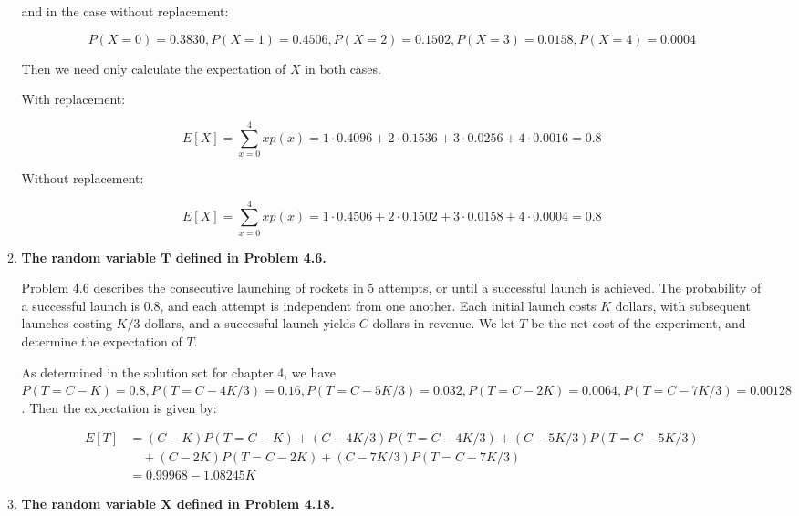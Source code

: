 \documentclass[10pt, oneside]{article}
\begin{document}
\begin{enumerate}[label=7.\arabic*]
\begin{enumerate}
	 and in the case without replacement:
	 
	  \[ P(X=0) = 0.3830, P(X = 1) = 0.4506, P(X = 2) = 0.1502, P(X = 3) = 0.0158, P(X = 4) = 0.0004 \]

	Then we need only calculate the expectation of $X$ in both cases.
	
	With replacement:
	
	\[ E[X] = \sum^4_{x=0} x p(x) = 1 \cdot 0.4096 + 2 \cdot 0.1536 + 3 \cdot 0.0256 + 4 \cdot 0.0016 = \boxed{0.8} \]
	
	Without replacement:
	
	\[ E[X] = \sum^4_{x=0} x p(x) = 1 \cdot 0.4506 + 2 \cdot 0.1502 + 3 \cdot 0.0158 + 4 \cdot 0.0004 = \boxed{0.8} \]
	
	\item  \begin{tcolorbox}[
	  colback=Cerulean!5!white,
	  colframe=Cerulean!75!black]
	\textbf{The random variable $\bm{T}$ defined in Problem 4.6.}
	\end{tcolorbox}
	
	Problem 4.6 describes the consecutive launching of rockets in 5 attempts, or until a successful launch is achieved. The probability of a successful launch is 0.8, and each attempt is independent from one another. Each initial launch costs $K$ dollars, with subsequent launches costing $K/3$ dollars, and a successful launch yields $C$ dollars in revenue. We let $T$ be the net cost of the experiment, and determine the expectation of $T$.
	
	As determined in the solution set for chapter 4, we have $P(T = C-K) = 0.8, P(T = C - 4K/3) = 0.16, P(T = C - 5K/3) = 0.032, P(T = C - 2K) = 0.0064, P(T = C - 7K/3) = 0.00128$. Then the expectation is given by:
	
	\begin{align*}
	E[T] &= (C-K) P(T = C-K) + (C - 4K/3) P(T = C - 4K/3) + (C - 5K/3) P(T = C - 5K/3) \\ 
	&\quad + (C - 2K) P(T = C - 2K) + (C - 7K/3) P(T = C - 7K/3) \\
	&= \boxed{0.99968 - 1.08245 K}
	\end{align*}
	
	\item  \begin{tcolorbox}[
	  colback=Cerulean!5!white,
	  colframe=Cerulean!75!black]
	\textbf{The random variable $\bm{X}$ defined in Problem 4.18.}
	\end{tcolorbox}
	

\end{enumerate}
\end{enumerate}
\end{document}
